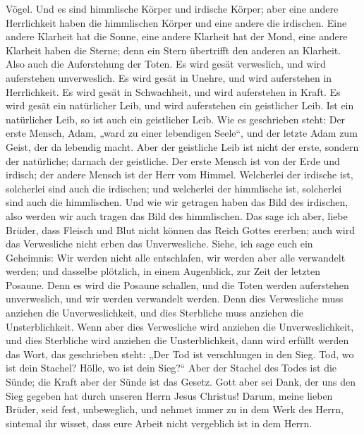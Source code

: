 Vögel.  Und es sind himmlische Körper und irdische
Körper; aber eine andere Herrlichkeit haben die himmlischen Körper und
eine andere die irdischen.  Eine andere Klarheit hat die
Sonne, eine andere Klarheit hat der Mond, eine andere Klarheit haben die
Sterne; denn ein Stern übertrifft den anderen an Klarheit.
 Also auch die Auferstehung der Toten. Es wird gesät
verweslich, und wird auferstehen unverweslich.  Es wird
gesät in Unehre, und wird auferstehen in Herrlichkeit. Es wird gesät in
Schwachheit, und wird auferstehen in Kraft.  Es wird
gesät ein natürlicher Leib, und wird auferstehen ein geistlicher Leib.
Ist ein natürlicher Leib, so ist auch ein geistlicher Leib.
 Wie es geschrieben steht: Der erste Mensch, Adam, „ward
zu einer lebendigen Seele``, und der letzte Adam zum Geist, der da
lebendig macht.  Aber der geistliche Leib ist nicht der
erste, sondern der natürliche; darnach der geistliche. 
Der erste Mensch ist von der Erde und irdisch; der andere Mensch ist der
Herr vom Himmel.  Welcherlei der irdische ist, solcherlei
sind auch die irdischen; und welcherlei der himmlische ist, solcherlei
sind auch die himmlischen.  Und wie wir getragen haben
das Bild des irdischen, also werden wir auch tragen das Bild des
himmlischen.  Das sage ich aber, liebe Brüder, dass
Fleisch und Blut nicht können das Reich Gottes ererben; auch wird das
Verwesliche nicht erben das Unverwesliche.  Siehe, ich
sage euch ein Geheimnis: Wir werden nicht alle entschlafen, wir werden
aber alle verwandelt werden;  und dasselbe plötzlich, in
einem Augenblick, zur Zeit der letzten Posaune. Denn es wird die Posaune
schallen, und die Toten werden auferstehen unverweslich, und wir werden
verwandelt werden.  Denn dies Verwesliche muss anziehen
die Unverweslichkeit, und dies Sterbliche muss anziehen die
Unsterblichkeit.  Wenn aber dies Verwesliche wird
anziehen die Unverweslichkeit, und dies Sterbliche wird anziehen die
Unsterblichkeit, dann wird erfüllt werden das Wort, das geschrieben
steht:  „Der Tod ist verschlungen in den Sieg. Tod, wo
ist dein Stachel? Hölle, wo ist dein Sieg?{}``  Aber der
Stachel des Todes ist die Sünde; die Kraft aber der Sünde ist das
Gesetz.  Gott aber sei Dank, der uns den Sieg gegeben hat
durch unseren Herrn Jesus Christus!  Darum, meine lieben
Brüder, seid fest, unbeweglich, und nehmet immer zu in dem Werk des
Herrn, sintemal ihr wisset, dass eure Arbeit nicht vergeblich ist in dem
Herrn.

